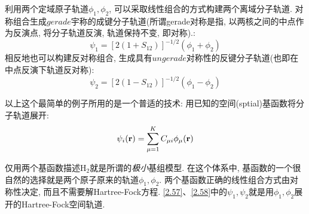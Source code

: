 利用两个定域原子轨道$\phi_1,\phi_2$, 可以采取线性组合的方式构建两个离域分子轨道. 对称组合生成$gerade$宇称的成键分子轨道(所谓gerade对称是指, 以两核之间的中点作为反演点, 将分子轨道反演, 轨道保持不变, 即对称).:
\begin{equation}
\label{2.57}
\psi_1=[2(1+S_{12})]^{-1/2}(\phi_1+\phi_2)
\end{equation}
相反地也可以构建反对称组合, 生成具有$ungerade$对称性的反键分子轨道(也即在中点反演下轨道反对称):
\begin{equation}
\label{2.58}
\psi_2=[2(1-S_{12})]^{-1/2}(\phi_1-\phi_2)
\end{equation}

以上这个最简单的例子所用的是一个普适的技术: 用已知的空间(sptial)基函数将分子轨道展开: 
\begin{equation}
\label{2.59}
\psi_i(\mathbf{r})=\sum_{\mu=1}^{K}C_{\mu i}\phi_{\mu}(\mathbf{r})
\end{equation} 

仅用两个基函数描述H$_2$就是所谓的\emph{极小}基组模型. 在这个体系中, 基函数的一个很自然的选择就是两个原子原来的轨道$\phi_1,\phi_2$. 两个基函数正确的线性组合方式由对称性决定, 而且不需要解Hartree-Fock方程. \ref{2.57}、\ref{2.58}中的$\psi_1,\psi_2$就是用$\phi_1,\phi_2$展开的Hartree-Fock空间轨道.

